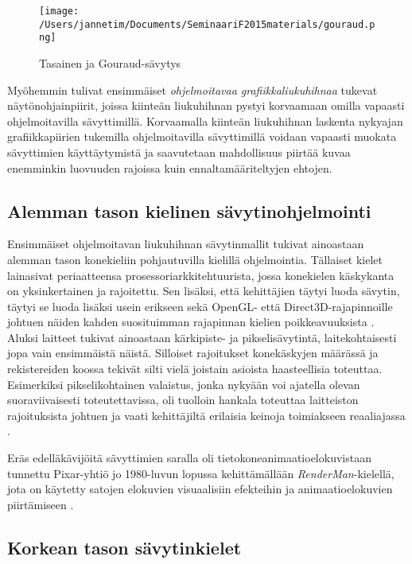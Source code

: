 \documentclass[finnish]{tktltiki2}
\theoremstyle{definition}
\theoremstyle{remark}
\begin{document}
\begin{figure}[!htpb]
\texttt{[image: /Users/jannetim/Documents/SeminaariF2015materials/gouraud.png]}
\caption{Tasainen ja Gouraud-sävytys}
\label{FGP}
\end{figure}

Myöhemmin tulivat ensimmäiset \emph{ohjelmoitavaa grafiikkaliukuhihnaa} tukevat näytönohjainpiirit, joissa kiinteän liukuhihnan pystyi korvaamaan omilla vapaasti ohjelmoitavilla sävyttimillä. Korvaamalla kiinteän liukuhihnan laskenta nykyajan grafiikkapiirien tukemilla ohjelmoitavilla sävyttimillä voidaan vapaasti muokata sävyttimien käyttäytymistä ja saavutetaan mahdollisuus piirtää kuvaa enemminkin luovuuden rajoissa kuin ennaltamääriteltyjen ehtojen. 

\subsection{Alemman tason kielinen sävytinohjelmointi}

Ensimmäiset ohjelmoitavan liukuhihnan sävytinmallit tukivat ainoastaan alemman tason konekieliin pohjautuvilla kielillä ohjelmointia. Tällaiset kielet lainasivat periaatteensa prosessoriarkkitehtuurista, jossa konekielen käskykanta on yksinkertainen ja rajoitettu. Sen lisäksi, että kehittäjien täytyi luoda sävytin, täytyi se luoda lisäksi usein erikseen sekä OpenGL- että Direct3D-rajapinnoille johtuen näiden kahden suosituimman rajapinnan kielien poikkeavuuksista . Aluksi laitteet tukivat ainoastaan kärkipiste- ja pikselisävytintä, laitekohtaisesti jopa vain ensimmäistä näistä. Silloiset rajoitukset konekäskyjen määrässä ja rekistereiden koossa tekivät silti vielä joistain asioista haasteellisia toteuttaa. Esimerkiksi pikselikohtainen valaistus, jonka nykyään voi ajatella olevan suoraviivaisesti toteutettavissa, oli tuolloin hankala toteuttaa laitteiston rajoituksista johtuen ja vaati kehittäjiltä erilaisia keinoja toimiakseen reaaliajassa \cite[s. 174-176]{She08}.

Eräs edelläkävijöitä sävyttimien saralla oli tietokoneanimaatioelokuvistaan tunnettu Pixar-yhtiö jo 1980-luvun lopussa kehittämällään \emph{RenderMan}-kielellä, jota on käytetty satojen elokuvien visuaalisiin efekteihin ja animaatioelokuvien piirtämiseen \cite{Pix15}.

\subsection{Korkean tason sävytinkielet}
\end{document}
